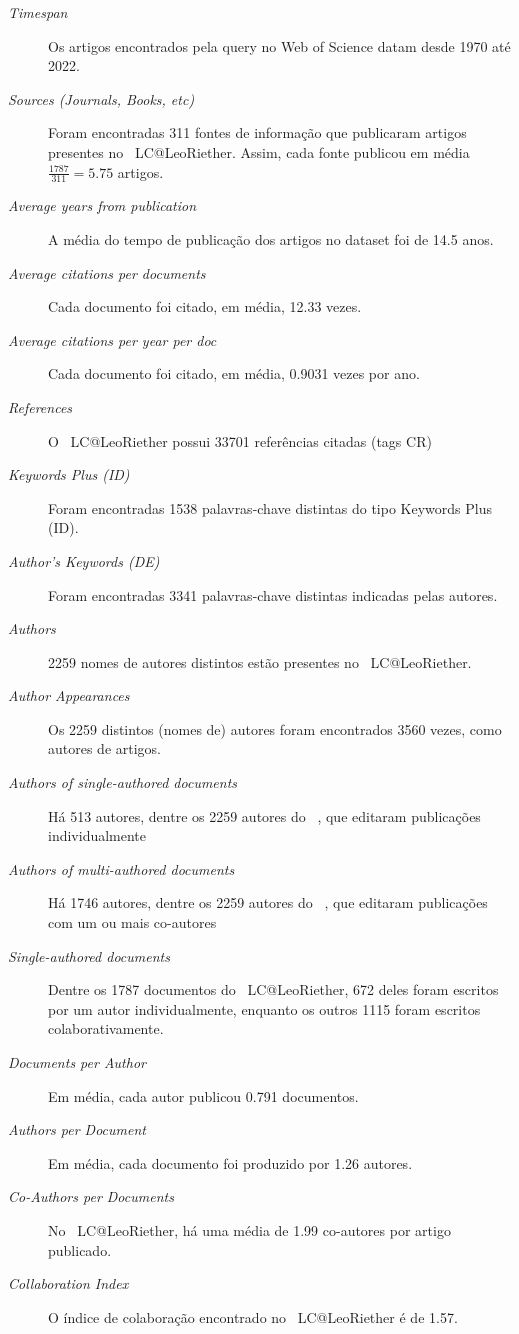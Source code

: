 \begin{description}
    \item [\textit{Timespan}] Os artigos encontrados pela query no Web of Science datam desde 1970 até 2022.
    \item [\textit{Sources (Journals, Books, etc)}] Foram encontradas 311 fontes de informação que publicaram artigos presentes no \dataset\ LC@LeoRiether. Assim, cada fonte publicou em média $\frac{1787}{311} =5.75$ artigos.
    \item [\textit{Average years from publication}] A média do tempo de publicação dos artigos no dataset foi de 14.5 anos.
    \item [\textit{Average citations per documents}] Cada documento foi citado, em média, 12.33 vezes.
    \item [\textit{Average citations per year per doc}] Cada documento foi citado, em média, 0.9031 vezes por ano.
    \item [\textit{References}] O \dataset\  LC@LeoRiether possui 33701 referências citadas (tags CR)
    \item [\textit{Keywords Plus (ID)}] Foram encontradas 1538 palavras-chave distintas do tipo Keywords Plus (ID).
    \item [\textit{Author's Keywords (DE)}] Foram encontradas 3341 palavras-chave distintas indicadas pelas autores.
    \item [\textit{Authors}] 2259 nomes de autores distintos estão presentes no \dataset\  LC@LeoRiether.
    \item [\textit{Author Appearances}] Os 2259 distintos (nomes de) autores foram encontrados 3560 vezes, como autores de artigos.
        
    \item [\textit{Authors of single-authored documents}] Há 513 autores, dentre os 2259 autores do \dataset\  , que editaram publicações individualmente
    \item [\textit{Authors of multi-authored documents}] Há 1746 autores, dentre os 2259 autores do \dataset\  , que editaram publicações com um ou mais co-autores
    \item [\textit{Single-authored documents}] Dentre os 1787 documentos do \dataset\  LC@LeoRiether, 672 deles foram escritos por um autor individualmente, enquanto os outros 1115 foram escritos colaborativamente.
    \item [\textit{Documents per Author}] Em média, cada autor publicou 0.791 documentos.
    \item [\textit{Authors per Document}] Em média, cada documento foi produzido por 1.26 autores.
    \item [\textit{Co-Authors per Documents}] No \dataset\ LC@LeoRiether, há uma média de 1.99 co-autores por artigo publicado.
    \item [\textit{Collaboration Index}] O índice de colaboração encontrado no \dataset\  LC@LeoRiether é de 1.57.
\end{description}


